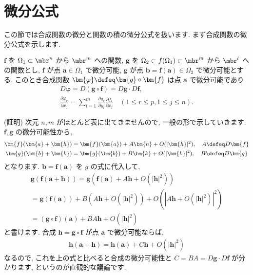 \documentclass[openany, a4paper, oneside]{jsbook}
\begin{document}
\section{微分公式}

この節では合成関数の微分と関数の積の微分公式を扱います.
まず合成関数の微分公式を示します.
\begin{thm}
 $\bm{f}$ を $\Omega_1 \subset \mbr^n$ から $\mbr^m$ への関数,
 $\bm{g}$ を $\Omega_2 \subset f ( \Omega_1 ) \subset \mbr^m$ から $\mbr^{l}$ への関数とし,
 $\bm{f}$ が点 $\bm{a} \in \Omega_1$ で微分可能,  $\bm{g}$ が点 $\bm{b} = \bm{f} ( \bm{a} ) \in \Omega_2$ で微分可能とする.
 このとき合成関数 $\bm{ \varphi } \defeq\bm{g} \circ \bm{f}$ は点 $\bm{a}$ で微分可能であり
 \begin{gather}
 D \bm{ \varphi }
 =
 D ( \bm{g} \circ \bm{f} )
 =
 D \bm{g} \cdot D \bm{f}
 , \\
 \frac{\partial \varphi _r} {\partial x_j}
 =
 \sum_{l=1}^m \frac{\partial g_r} {\partial  y_l} \frac{\partial f_l} {\partial x_j}
 \quad ( 1 \leq r \leq p,  1 \leq j \leq n ).
 \end{gather}
 \end{thm}
(証明)
次元 $n,m$ がほとんど表に出てきませんので, 一般の形で示していきます.
$\bm{f},\bm{g}$ の微分可能性から,
\begin{gather}
\bm{f} ( \bm{a} + \bm{h} )
=
\bm{f} ( \bm{a} ) + A \bm{h} + O ( | \bm{h} |^2 ) , \quad A \defeq D \bm{f} \\
\bm{g} ( \bm{b} + \bm{k} )
=
\bm{g} ( \bm{b} ) + B \bm{k} + O ( | \bm{k} |^2 ) , \quad B \defeq D \bm{g}
\end{gather}
となります.
$\bm{b} = \bm{f} ( \bm{a} )$ を $g$ の式に代入して,
\begin{gather}
\bm{g} \left ( \bm{f} ( \bm{a} + \bm{h} ) \right)
=
\bm{g} \left ( \bm{f} ( \bm{a} ) + A \bm{h} + O ( | \bm{h} |^2 ) \right) \\
=
\bm{g} \left ( \bm{f} ( \bm{a} ) \right)
+B \left ( A \bm{h} + O ( | \bm{h} |^2 ) \right) + O \left ( | A \bm{h} + O ( | \bm{h} |^2 ) |^2 \right) \\
=
( \bm{g} \circ \bm{f} ) ( \bm{a} )
+B A \bm{h} + O \left ( | \bm{h} |^2 \right)
\end{gather}
と書けます.
合成 $\bm{h} = \bm{g} \circ \bm{f}$ が点 $\bm{a}$ で微分可能ならば,
\begin{gather}
\bm{h} ( \bm{a} + \bm{h} )
=
\bm{h} ( \bm{a} ) + C \bm{h} + O ( | \bm{h} |^2 )
\end{gather}
なるので, これを上の式と比べると合成の微分可能性と $C = BA = D \bm{g} \cdot D \bm{f}$ が分かります,
というのが直観的な議論です.
\end{document}
